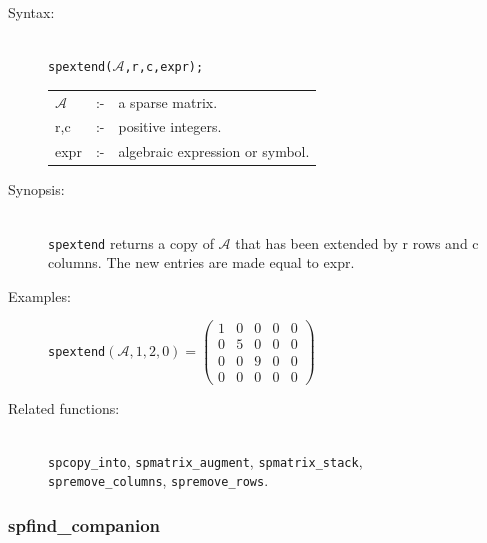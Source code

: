 \begin{description}
\item[Syntax:]\mbox{}\\
{\tt spextend($\mathcal{A}$,r,c,expr);}\\[2mm]
\begin{tabular}{l l l}
$\mathcal{A}$ &:-& a sparse matrix. \\
r,c        &:-& positive integers. \\
expr      &:-& algebraic expression or symbol.
\end{tabular}

\item[Synopsis:]\mbox{}\\
                \texttt{spextend} returns a copy of $\mathcal{A}$ that has been
                extended by r rows and c columns. The new entries are
                made equal to expr.

\item[Examples:]
\texttt{spextend}\((\mathcal{A},1,2,0) =
\begin{pmatrix} 1 & 0 & 0 & 0 & 0 \\ 0 & 5 & 0 & 0 & 0
\\ 0 & 0 & 9 & 0 & 0 \\ 0 & 0 & 0 & 0 & 0
\end{pmatrix}\)

\item[Related functions:]\mbox{}\\
\texttt{spcopy\_into}, \texttt{spmatrix\_augment},
\texttt{spmatrix\_stack},\\ \texttt{spremove\_columns},
\texttt{spremove\_rows}.

\end{description}


\subsubsection{spfind\_companion}
\label{sparse:spfind_companion}
\hypertarget{operator:SPFIND_COMPANION}{}

